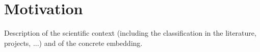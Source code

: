 \section{Motivation}
\label{sec:motivation}

Description of the scientific context (including the classification in the literature, projects, ...) and of the concrete embedding.